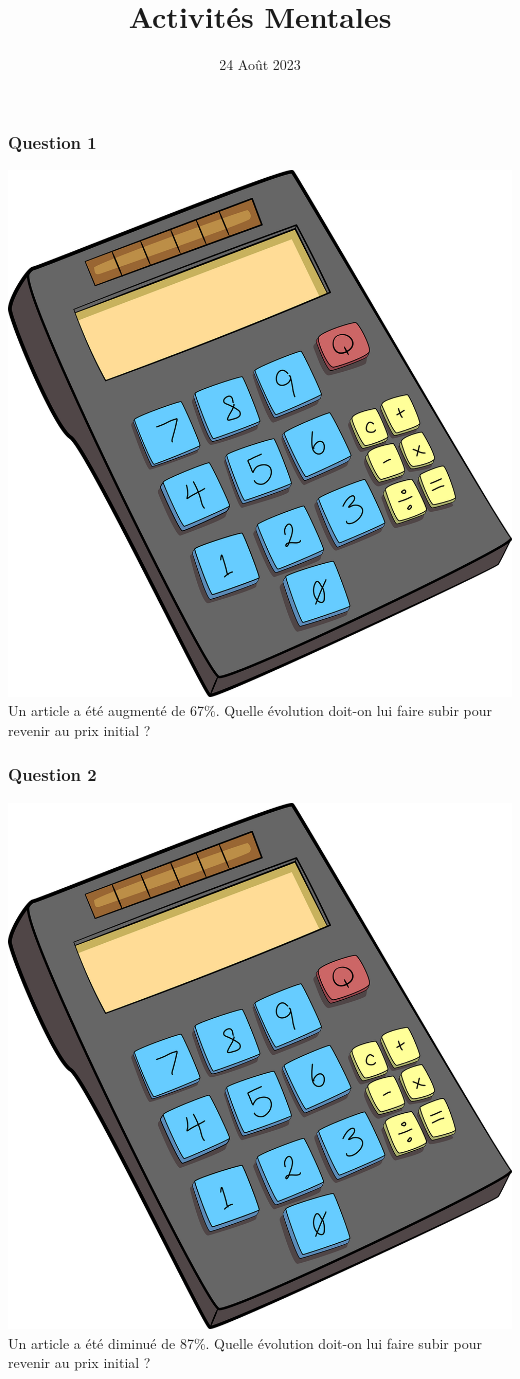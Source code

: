 \documentclass[15pt, mathserif]{beamer}
\title{Activités Mentales}
\date{24 Août 2023}
\begin{document}
\begin{frame}
    \titlepage
\end{frame}

\begin{frame} 
	\frametitle{Question 1}
 \includegraphics[scale=0.01]{calculatrice} Un article a été augmenté de 67\%. Quelle évolution doit-on lui faire subir pour revenir au prix initial ? \end{frame}


\begin{frame} 
	\frametitle{Question 2}
 \includegraphics[scale=0.01]{calculatrice} Un article a été diminué de 87\%. Quelle évolution doit-on lui faire subir pour revenir au prix initial ? \end{frame}
\end{document}
